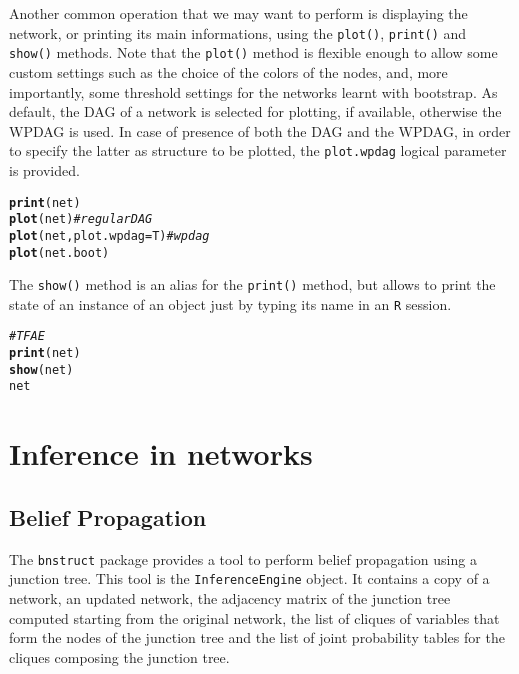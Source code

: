 \documentclass{article}\usepackage[]{graphicx}\usepackage[]{color}
\makeatletter
\newcommand{\hlcom}[1]{\textcolor[rgb]{0.678,0.584,0.686}{\textit{#1}}}%
\newcommand{\hlstd}[1]{\textcolor[rgb]{0.345,0.345,0.345}{#1}}%
\newcommand{\hlkwc}[1]{\textcolor[rgb]{0.333,0.667,0.333}{#1}}%
\newcommand{\hlkwd}[1]{\textcolor[rgb]{0.737,0.353,0.396}{\textbf{#1}}}%
\newenvironment{kframe}{%
 \def\at@end@of@kframe{}%
 \ifinner\ifhmode%
  \def\at@end@of@kframe{\end{minipage}}%
  \begin{minipage}{\columnwidth}%
 \fi\fi%
 \def\FrameCommand##1{\hskip\@totalleftmargin \hskip-\fboxsep
 \colorbox{shadecolor}{##1}\hskip-\fboxsep
     \hskip-\linewidth \hskip-\@totalleftmargin \hskip\columnwidth}%
 \MakeFramed {\advance\hsize-\width
   \@totalleftmargin\z@ \linewidth\hsize
   \@setminipage}}%
 {\par\unskip\endMakeFramed%
 \at@end@of@kframe}
\newenvironment{knitrout}{}{} %
\newcommand{\Robject}[1]{{\texttt{#1}}}
\newcommand{\Rpackage}[1]{{\texttt{#1}}}
\newcommand{\Rmethod}[1]{{\texttt{#1}}}
\newcommand{\Rfunarg}[1]{{\texttt{#1}}}
\makeatother
\begin{document}
Another common operation that we may want to perform is displaying the network, or printing its main informations, using the
\Rmethod{plot()}, \Rmethod{print()} and \Rmethod{show()} methods. Note that the \Rmethod{plot()} method is flexible enough to allow 
some custom settings such as the choice of the colors of the nodes, and, more importantly, some threshold settings 
for the networks learnt with bootstrap. As default, the DAG of a network is selected for plotting, if available,
otherwise the WPDAG is used. In case of presence of both the DAG and the WPDAG, in order to specify the latter as
structure to be plotted, the \Rfunarg{plot.wpdag} logical parameter is provided.
\begin{knitrout}
\color{fgcolor}\begin{kframe}
\begin{alltt}
\hlkwd{print}\hlstd{(net)}
\hlkwd{plot}\hlstd{(net)} \hlcom{# regular DAG}
\hlkwd{plot}\hlstd{(net,} \hlkwc{plot.wpdag}\hlstd{=T)} \hlcom{# wpdag}
\hlkwd{plot}\hlstd{(net.boot)}
\end{alltt}
\end{kframe}
\end{knitrout}

The \Rmethod{show()} method is an alias for the \Rmethod{print()} method, but allows to print the state of an instance of an object
just by typing its name in an \texttt{R} session.
\begin{knitrout}
\color{fgcolor}\begin{kframe}
\begin{alltt}
\hlcom{# TFAE}
\hlkwd{print}\hlstd{(net)}
\hlkwd{show}\hlstd{(net)}
\hlstd{net}
\end{alltt}
\end{kframe}
\end{knitrout}


\section{Inference in networks}
\subsection{Belief Propagation}
The \Rpackage{bnstruct} package provides a tool to perform belief propagation using a junction tree.
This tool is the \Robject{InferenceEngine} object.
It contains a copy of a network, an updated network, the adjacency matrix of the junction tree computed
starting from the original network, the list of cliques of variables that form the nodes of the junction tree
and the list of joint probability tables for the cliques composing the junction tree.
\end{document}
